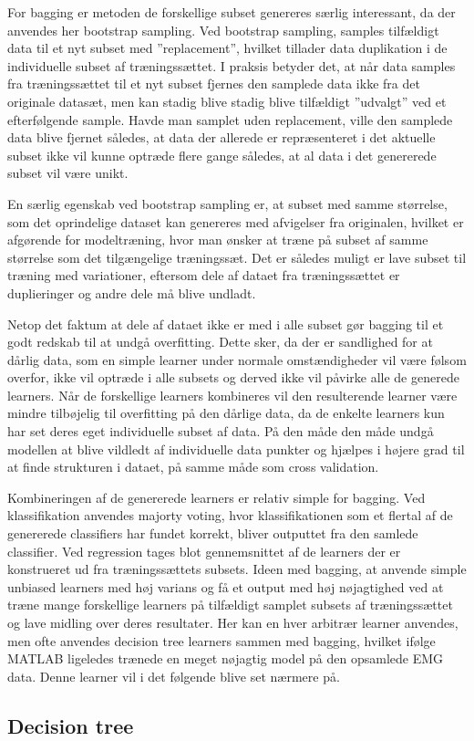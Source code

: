 For bagging er metoden de forskellige subset genereres særlig interessant, da der anvendes her bootstrap sampling.
Ved bootstrap sampling, samples tilfældigt data til et nyt subset med ”replacement”, hvilket tillader data duplikation i de individuelle subset af træningssættet. I praksis betyder det, at når data samples fra træningssættet til et nyt subset fjernes den samplede data ikke fra det originale datasæt, men kan stadig blive stadig blive tilfældigt ”udvalgt” ved et efterfølgende sample. Havde man samplet uden replacement, ville den samplede data blive fjernet således, at data der allerede er repræsenteret i det aktuelle subset ikke vil kunne optræde flere gange således, at al data i det genererede subset vil være unikt.

En særlig egenskab ved bootstrap sampling er, at subset med samme størrelse, som det oprindelige dataset kan genereres med afvigelser fra originalen, hvilket er afgørende for modeltræning, hvor man ønsker at træne på subset af samme størrelse som det tilgængelige træningssæt. Det er således muligt er lave subset til træning med variationer, eftersom dele af dataet fra træningssættet er duplieringer og andre dele må blive undladt. 

Netop det faktum at dele af dataet ikke er med i alle subset gør bagging til et godt redskab til at undgå overfitting. Dette sker, da der er sandlighed for at dårlig data, som en simple learner under normale omstændigheder vil være følsom overfor, ikke vil optræde i alle subsets og derved ikke vil påvirke alle de generede learners. Når de forskellige learners kombineres vil den resulterende learner være mindre tilbøjelig til overfitting på den dårlige data, da de enkelte learners kun har set deres eget individuelle subset af data. På den måde den måde undgå modellen at blive vildledt af individuelle data punkter og hjælpes i højere grad til at finde strukturen i dataet, på samme måde som cross validation.

Kombineringen af de genererede learners er relativ simple for bagging. Ved klassifikation anvendes majorty voting, hvor klassifikationen som et flertal af de genererede classifiers har fundet korrekt, bliver outputtet fra den samlede classifier.
Ved regression tages blot gennemsnittet af de learners der er konstrueret ud fra træningssættets subsets. Ideen med bagging, at anvende simple unbiased learners med høj varians og få et output med høj nøjagtighed ved at træne mange forskellige learners på tilfældigt samplet subsets af træningssættet og lave midling over deres resultater. Her kan en hver arbitrær learner anvendes, men ofte anvendes decision tree learners sammen med bagging, hvilket ifølge MATLAB ligeledes trænede en meget nøjagtig model på den opsamlede EMG data. Denne learner vil i det følgende blive set nærmere på.

\subsection{Decision tree}
